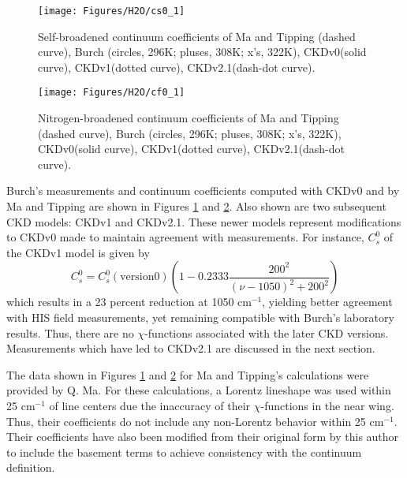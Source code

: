 \documentclass[11pt]{article}
\begin{document}
\begin{figure}
\begin{center}\texttt{[image: Figures/H2O/cs0\_1]}
\end{center}
   \caption[Self-broadened continuum coefficients of Ma and Tipping, Burch
	and Clough.]{Self-broadened continuum coefficients of Ma and
Tipping (dashed curve), Burch (circles, 296K; pluses, 308K; x's, 322K),
	CKDv0(solid curve), CKDv1(dotted curve), CKDv2.1(dash-dot curve).}
   \label{fig:cs0_1}
\end{figure}

\begin{figure}
\begin{center}\texttt{[image: Figures/H2O/cf0\_1]}\end{center}
   \caption[Nitrogen-broadened continuum coefficients of Ma and Tipping, 
  Burch and Clough.]{Nitrogen-broadened continuum coefficients of Ma and 
Tipping (dashed curve), Burch (circles, 296K; pluses, 308K; x's, 322K),
	CKDv0(solid curve), CKDv1(dotted curve), CKDv2.1(dash-dot curve).}
   \label{fig:cf0_1}
\end{figure}

Burch's measurements and continuum coefficients computed with CKDv0 and by
Ma and Tipping are shown in Figures \ref{fig:cs0_1} and
\ref{fig:cf0_1}.  Also shown are two subsequent CKD models:
CKDv1 and CKDv2.1.  These newer models represent modifications to CKDv0 made
to maintain agreement with measurements.  For instance, $C_s^0$ 
of the CKDv1 model is given by
\begin{equation}
C_s^0=C_s^0(\mbox{version} 0) \left( 1 - 0.2333\frac{200^2}{(\nu-1050)^2 + 200^2}\right)
\end{equation}
which results in a 23 percent reduction at 1050 cm$^{-1}$, yielding better
agreement with HIS field measurements, yet remaining compatible with
Burch's laboratory results.  Thus, there are no $\chi$-functions
associated with the later CKD versions.  Measurements which have led to CKDv2.1
are discussed in the next section.  

The data shown in Figures \ref{fig:cs0_1} and \ref{fig:cf0_1} for Ma and
Tipping's calculations were provided by Q. Ma.  For these calculations, a
Lorentz lineshape was used within 25 cm$^{-1}$ of line centers due the
inaccuracy of their $\chi$-functions in the near wing.  Thus, their
coefficients do not include any non-Lorentz behavior within 25 cm$^{-1}$.
Their coefficients have also been modified from their original form
by this author to include the basement terms to achieve consistency 
with the continuum definition.
\end{document}
